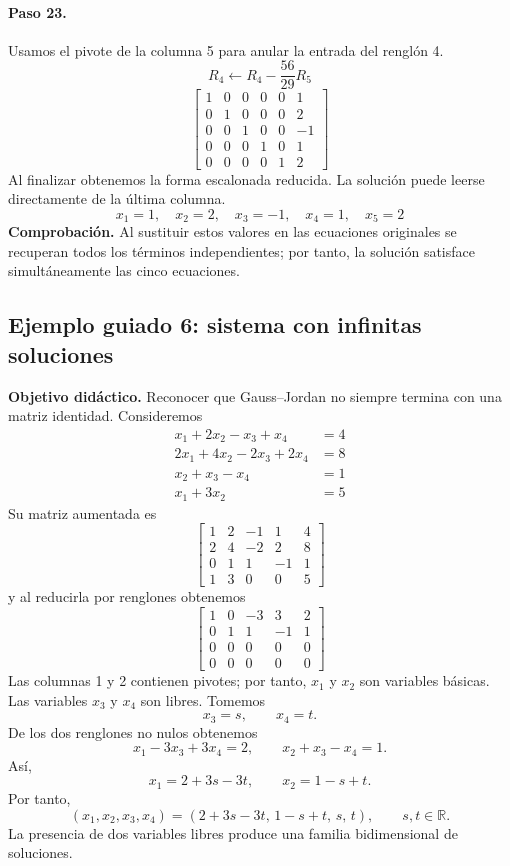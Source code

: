 \documentclass[12pt]{article}
\theoremstyle{remark}
\newcommand{\R}{\mathbb{R}}
\begin{document}
\paragraph{Paso 23.} Usamos el pivote de la columna 5 para anular la entrada del renglón 4.
\[
R_{4}\leftarrow R_{4}-\frac{56}{29}R_{5}
\]
\[
\left[\begin{array}{ccccc|c}
1 & 0 & 0 & 0 & 0 & 1\\
0 & 1 & 0 & 0 & 0 & 2\\
0 & 0 & 1 & 0 & 0 & -1\\
0 & 0 & 0 & 1 & 0 & 1\\
0 & 0 & 0 & 0 & 1 & 2
\end{array}\right]
\]
Al finalizar obtenemos la forma escalonada reducida. La solución puede leerse directamente de la última columna.
\[
\boxed{x_{1}=1,\quad x_{2}=2,\quad x_{3}=-1,\quad x_{4}=1,\quad x_{5}=2}
\]
\textbf{Comprobación.} Al sustituir estos valores en las ecuaciones originales se recuperan todos los términos independientes; por tanto, la solución satisface simultáneamente las cinco ecuaciones.

\subsection*{Ejemplo guiado 6: sistema con infinitas soluciones}

\textbf{Objetivo didáctico.} Reconocer que Gauss--Jordan no siempre termina con una matriz identidad.
Consideremos
\[
\begin{aligned}
x_{1} + 2 x_{2} - x_{3} + x_{4} &= 4\\
2 x_{1} + 4 x_{2} - 2 x_{3} + 2 x_{4} &= 8\\
x_{2} + x_{3} - x_{4} &= 1\\
x_{1} + 3 x_{2} &= 5
\end{aligned}
\]
Su matriz aumentada es
\[
\left[\begin{array}{cccc|c}
1 & 2 & -1 & 1 & 4\\
2 & 4 & -2 & 2 & 8\\
0 & 1 & 1 & -1 & 1\\
1 & 3 & 0 & 0 & 5
\end{array}\right]
\]
y al reducirla por renglones obtenemos
\[
\left[\begin{array}{cccc|c}
1 & 0 & -3 & 3 & 2\\
0 & 1 & 1 & -1 & 1\\
0 & 0 & 0 & 0 & 0\\
0 & 0 & 0 & 0 & 0
\end{array}\right]
\]
Las columnas 1 y 2 contienen pivotes; por tanto, \(x_1\) y \(x_2\) son variables básicas. Las variables
\(x_3\) y \(x_4\) son libres. Tomemos
\[
x_3=s,\qquad x_4=t.
\]
De los dos renglones no nulos obtenemos
\[
x_1-3x_3+3x_4=2,\qquad x_2+x_3-x_4=1.
\]
Así,
\[
x_1=2+3s-3t,\qquad x_2=1-s+t.
\]
Por tanto,
\[
\boxed{(x_1,x_2,x_3,x_4)=(2+3s-3t,\,1-s+t,\,s,\,t),\qquad s,t\in\R.}
\]
La presencia de dos variables libres produce una familia bidimensional de soluciones.
\end{document}
